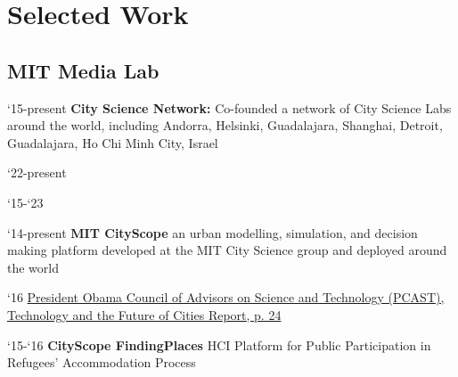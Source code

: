 \section*{Selected Work}

\subsection*{MIT Media Lab}

\begin{tablist}

   \item[`15-present] \tab \textbf{City Science Network:} {Co-founded a network of City Science Labs around the world, including Andorra, Helsinki, Guadalajara, Shanghai, Detroit, Guadalajara, Ho Chi Minh City, Israel}

      \begin{tablist}
      \item[`22-present] 
   \end{tablist}

   \begin{tablist}
      \item[`15-`23] 
   \end{tablist}


   \item[`14-present] \tab \textbf{MIT CityScope} {an urban modelling, simulation, and decision making platform developed at the MIT City Science group and deployed around the world}

   \begin{tablist}
      \item[`16] \tab \href{https://obamawhitehouse.archives.gov/blog/2016/02/23/pcast-releases-technology-and-future-cities-report-president}{President Obama Council of Advisors on Science and Technology (PCAST), Technology and the Future of Cities Report, p. 24}
   \end{tablist}

   \item[`15-`16] \tab \textbf{CityScope FindingPlaces} {HCI Platform for Public Participation in Refugees' Accommodation Process}


\end{tablist}
